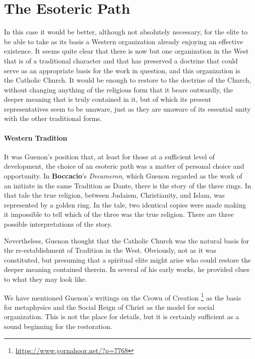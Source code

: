 \section{The Esoteric Path}

\begin{quotex}
In this case it would be better, although not absolutely necessary, for the elite to be able to take as its basis a Western organization already enjoying an effective existence. It seems quite clear that there is now but one organization in the West that is of a traditional character and that has preserved a doctrine that could serve as an appropriate basis for the work in question, and this organization is the Catholic Church. It would be enough to restore to the doctrine of the Church, without changing anything of the religious form that it bears outwardly, the deeper meaning that is truly contained in it, but of which its present representatives seem to be unaware, just as they are unaware of its essential unity with the other traditional forms. 

\end{quotex}
\paragraph{Western Tradition}
It was Guenon's position that, at least for those at a sufficient level of development, the choice of an esoteric path was a matter of personal choice and opportunity. In \textbf{Boccacio}'s \emph{Decameron}, which Guenon regarded as the work of an initiate in the same Tradition as Dante, there is the story of the three rings. In that tale the true religion, between Judaism, Christianity, and Islam, was represented by a golden ring. In the tale, two identical copies were made making it impossible to tell which of the three was the true religion. There are three possible interpretations of the story.

Nevertheless, Guenon thought that the Catholic Church was the natural basis for the re-establishment of Tradition in the West. Obviously, not as it was constituted, but presuming that a spiritual elite might arise who could restore the deeper meaning contained therein. In several of his early works, he provided clues to what they may look like.

We have mentioned Guenon's writings on the Crown of Creation \footnote{\url{https://www.gornahoor.net/?p=7768}} as the basis for metaphysics and the Social Reign of Christ as the model for social organization. This is not the place for details, but it is certainly sufficient as a sound beginning for the restoration.

